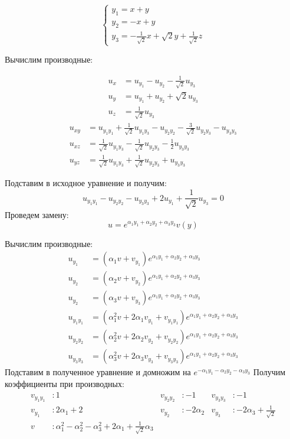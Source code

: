 \documentclass[a4paper,12pt]{article}
\begin{document}
    \begin{equation*}
        \begin{cases}
            y_1 = x+y \\
            y_2 = -x + y \\
            y_3 = -\frac{1}{\sqrt{2}}x + \sqrt{2}y + \frac{1}{\sqrt{2}}z
       \end{cases}            
    \end{equation*}

    Вычислим производные:
    
    \begin{align*}
        u_x &= u_{y_1} - u_{y_2} - \frac{1}{\sqrt{2}}u_{y_3} \\
        u_y &= u_{y_1} + u_{y_2} + \sqrt{2}u_{y_3} \\
        u_z &= \frac{1}{\sqrt{2}}u_{y_3}
    \end{align*}
    \begin{align*}
        u_{xy} &= u_{y_1y_1} + \frac{1}{\sqrt{2}}u_{y_1y_3} -u_{y_2y_2} - \frac{3}{\sqrt{2}}u_{y_2y_3} - u_{y_3y_3} \\
        u_{xz} &= \frac{1}{\sqrt{2}}u_{y_1y_3} - \frac{1}{\sqrt{2}}u_{y_2y_3} - \frac{1}{2}u_{y_3y_3} \\
        u_{yz} &= \frac{1}{\sqrt{2}}u_{y_1y_3} + \frac{1}{\sqrt{2}}u_{y_2y_3} + u_{y_3y_3}
    \end{align*}

    Подставим в исходное уравнение и получим:
    $$u_{y_1y_1} - u_{y_2y_2} - u_{y_3y_3} + 2u_{y_1} +\frac{1}{\sqrt{2}}u_{y_3} = 0$$
    Проведем замену:
    $$u = e^{\alpha_1y_1 + \alpha_2y_2 + \alpha_3y_3}v(y)$$

    Вычислим производные:
    \begin{align*}
        u_{y_1} &= (\alpha_1v + v_{y_1})e^{\alpha_1y_1 + \alpha_2y_2 + \alpha_3y_3} \\
        u_{y_2} &= (\alpha_2v + v_{y_2})e^{\alpha_1y_1 + \alpha_2y_2 + \alpha_3y_3} \\
        u_{y_2} &= (\alpha_3v + v_{y_3})e^{\alpha_1y_1 + \alpha_2y_2 + \alpha_3y_3} \\
        u_{y_1y_1} &= (\alpha_1^2v + 2\alpha_1v_{y_1} + v_{y_1y_1})e^{\alpha_1y_1 + \alpha_2y_2 + \alpha_3y_3} \\
        u_{y_2y_2} &= (\alpha_2^2v + 2\alpha_2v_{y_2} + v_{y_2y_2})e^{\alpha_1y_1 + \alpha_2y_2 + \alpha_3y_3} \\
        u_{y_3y_3} &= (\alpha_3^2v + 2\alpha_3v_{y_3} + v_{y_3y_3})e^{\alpha_1y_1 + \alpha_2y_2 + \alpha_3y_3}
    \end{align*}
    Подставим в полученное уравнение и домножим на $e^{-\alpha_1y_1 - \alpha_2y_2 - \alpha_3y_3}$
    \newline Получим коэффициенты при производных:
    \begin{align*}
        v_{y_1y_1} &: 1 &v_{y_2y_2} &: -1 &v_{y_3y_3} &: -1 \\
        v_{y_1} &: 2\alpha_1 + 2 &v_{y_2} &: -2\alpha_2 &v_{y_3} &: -2\alpha_3 + \frac{1}{\sqrt{2}} \\
        v &: \alpha_1^2 - \alpha_2^2 - \alpha_3^2 + 2\alpha_1 + \frac{1}{\sqrt{2}}\alpha_3
    \end{align*}
\end{document}
